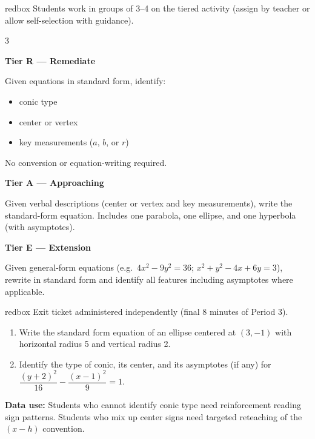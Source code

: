 \documentclass[10pt]{article}
\begin{document}
\begin{skillbox}{redbox}
Students work in groups of 3--4 on the tiered activity (assign by teacher or
allow self-selection with guidance).

\begin{multicols}{3}

\textbf{Tier R --- Remediate}

Given equations in standard form, identify:
\begin{itemize}[leftmargin=1em, itemsep=2pt]
  \item conic type
  \item center or vertex
  \item key measurements ($a$, $b$, or $r$)
\end{itemize}
No conversion or equation-writing required.

\columnbreak

\textbf{Tier A --- Approaching}

Given verbal descriptions (center or vertex and key measurements), write
the standard-form equation. Includes one parabola, one ellipse, and one
hyperbola (with asymptotes).

\columnbreak

\textbf{Tier E --- Extension}

Given general-form equations (e.g.\ $4x^2 - 9y^2 = 36$;
$x^2 + y^2 - 4x + 6y = 3$), rewrite in standard form and identify all
features including asymptotes where applicable.

\end{multicols}
\end{skillbox}

\vspace{0.08in}

\begin{skillbox}{redbox}
Exit ticket administered independently (final 8 minutes of Period 3).

\begin{enumerate}[leftmargin=1.4em, itemsep=4pt]
  \item Write the standard form equation of an ellipse centered at $(3, -1)$
    with horizontal radius 5 and vertical radius 2.
  \item Identify the type of conic, its center, and its asymptotes (if any)
    for $\dfrac{(y+2)^2}{16} - \dfrac{(x-1)^2}{9} = 1$.
\end{enumerate}

\textbf{Data use:} Students who cannot identify conic type need reinforcement
reading sign patterns. Students who mix up center signs need targeted reteaching
of the $(x - h)$ convention.
\end{skillbox}
\end{document}

